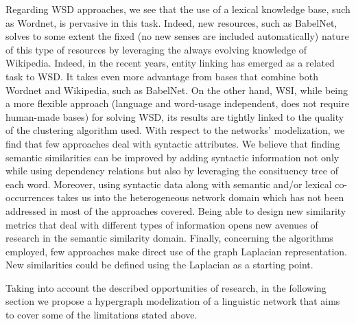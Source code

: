 Regarding WSD approaches, we see that the use of a lexical knowledge base, such as Wordnet, is pervasive in this task. Indeed, new resources, such as BabelNet, solves to some extent the fixed (no new senses are included automatically) nature of this type of resources by leveraging the always evolving knowledge of Wikipedia. Indeed, in the recent years, entity linking has emerged as a related task to WSD. It takes even more advantage from bases that combine both Wordnet and Wikipedia, such as BabelNet. On the other hand, WSI, while being a more flexible approach (language and word-usage independent, does not require human-made bases)  for solving WSD, its results are tightly linked to the quality of the clustering algorithm used. 
% 
 With respect to the networks' modelization, we find that few approaches deal with syntactic attributes. We believe that finding semantic similarities can be improved by adding syntactic information not only  while using dependency relations but also by leveraging the consituency tree of each word. Moreover, using syntactic data along with semantic and/or lexical co-occurrences takes us into the heterogeneous network domain which has not been addressed in most of the approaches covered. Being able to design new similarity metrics that deal with different types of information opens new avenues of research in the semantic similarity domain. Finally, concerning the algorithms employed, few approaches make direct use of the graph Laplacian representation. New similarities could be defined using the Laplacian as a starting point. 


Taking into account the described opportunities of research, in the following section we propose a  hypergraph modelization of a linguistic network that aims to cover some of the limitations stated above. 



